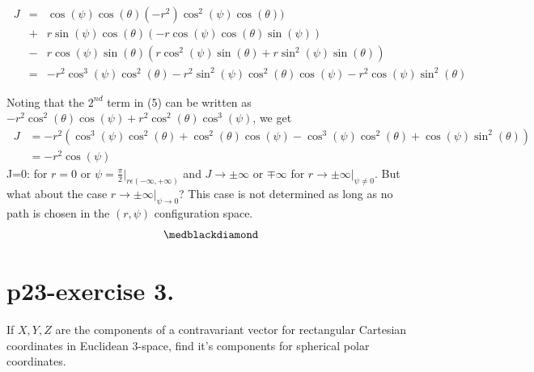 \begin{eqnarray}
\ J &=& \cos(\psi)\cos(\theta)(-r^{2})\cos^{2}(\psi)\cos(\theta))\\ &+& r\sin(\psi) \cos(\theta)(-r\cos(\psi)\cos(\theta)\sin(\psi)) \\&-& r\cos(\psi)\sin(\theta)(r\cos^{2}(\psi)\sin(\theta)+r\sin^{2}(\psi)\sin(\theta))\\
&=& -r^{2}\cos^{3}(\psi)\cos^{2}(\theta)
-r^{2}\sin^{2}(\psi)\cos^{2}(\theta)\cos(\psi)-r^{2}\cos(\psi)\sin^{2}(\theta)
\end{eqnarray}



Noting that the $2^{nd}$ term in (5) can be written as $-r^{2}\cos^{2}(\theta)\cos(\psi)+r^{2}\cos^{2}(\theta)\cos^{3}(\psi)$, we get
\begin{align}
\ J &=  -r^{2}(\cos^{3}(\psi)\cos^{2}(\theta)+\cos^{2}(\theta)\cos(\psi)-\cos^{3}(\psi)\cos^{2}(\theta)+\cos(\psi)\sin^{2}(\theta))\\
\ &= -r^{2}\cos(\psi)
\end{align}
J=0: for $r=0$ or $\psi = \frac{\pi}{2}|_{r \epsilon (-\infty, +\infty)}$ and $J\rightarrow \pm\infty$ or $\mp\infty$ for $r\rightarrow \pm\infty|_{\psi\neq 0}$. But what about the case $r\rightarrow \pm\infty|_{\psi\rightarrow 0}$? This case is not determined as long as no path is chosen in the $(r,\psi)$ configuration space.
$$\medblackdiamond$$
\pagebreak[4]

\section{p23-exercise 3.}
\begin{tcolorbox}
If $X, Y,Z$ are the components of a contravariant vector for rectangular Cartesian coordinates in Euclidean 3-space, find it's components for spherical polar coordinates.
\end{tcolorbox}

